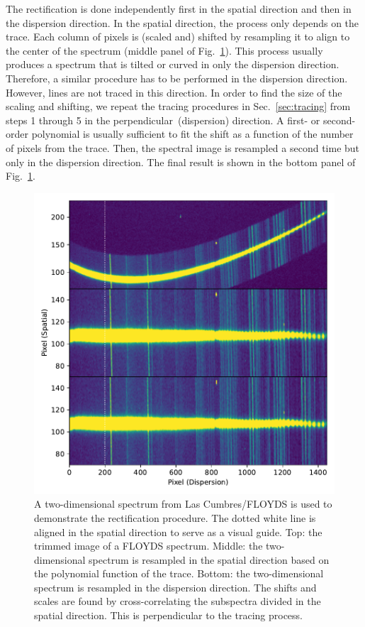 \documentclass[linenumbers, twocolumn]{aastex631}
\begin{document}
The rectification is done independently first in the spatial direction and then
in the dispersion direction. In the spatial direction, the process only depends
on the trace. Each column of pixels is (scaled and) shifted by resampling it to
align to the center of the spectrum (middle panel of Fig.~\ref{fig:rectify}).
This process usually produces a spectrum that is tilted or curved in only the
dispersion direction. Therefore, a similar procedure has to be performed in
the dispersion direction. However, lines are not traced in this direction. In
order to find the size of the scaling and shifting, we repeat the tracing
procedures in Sec.~\ref{sec:tracing} from steps 1 through 5 in the
perpendicular~(dispersion) direction. A first- or second-order polynomial is
usually sufficient to fit the shift as a function of the number of pixels from
the trace. Then, the spectral image is resampled a second time but only in the
dispersion direction. The final result is shown in the bottom panel of
Fig.~\ref{fig:rectify}.

\begin{figure}
    \centering
    \includegraphics[width=\columnwidth]{fig_02_rectification.pdf}
    \caption{A two-dimensional spectrum from Las Cumbres/FLOYDS is used to demonstrate
    the rectification procedure. The dotted white line is aligned in the
    spatial direction to serve as a visual guide. Top: the trimmed image of a
    FLOYDS spectrum. Middle: the two-dimensional spectrum is resampled in the
    spatial direction based on the polynomial function of the trace. Bottom:
    the two-dimensional spectrum is resampled in the dispersion direction. The
    shifts and scales are found by cross-correlating the subspectra divided in
    the spatial direction. This is perpendicular to the tracing process.}
    \label{fig:rectify}
\end{figure}
\end{document}
